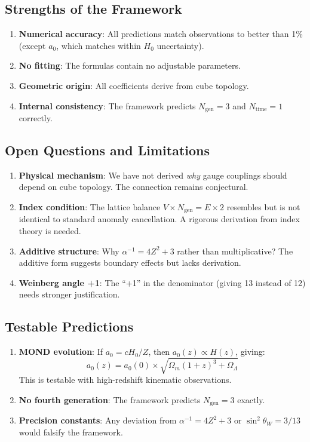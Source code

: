 \documentclass[twocolumn,showpacs,preprintnumbers,amsmath,amssymb,prd]{revtex4-2}
\begin{document}
\subsection{Strengths of the Framework}

\begin{enumerate}
\item \textbf{Numerical accuracy}: All predictions match observations to better than 1\% (except $a_0$, which matches within $H_0$ uncertainty).
\item \textbf{No fitting}: The formulas contain no adjustable parameters.
\item \textbf{Geometric origin}: All coefficients derive from cube topology.
\item \textbf{Internal consistency}: The framework predicts $N_{\text{gen}} = 3$ and $N_{\text{time}} = 1$ correctly.
\end{enumerate}

\subsection{Open Questions and Limitations}

\begin{enumerate}
\item \textbf{Physical mechanism}: We have not derived \emph{why} gauge couplings should depend on cube topology. The connection remains conjectural.
\item \textbf{Index condition}: The lattice balance $V \times N_{\text{gen}} = E \times 2$ resembles but is not identical to standard anomaly cancellation. A rigorous derivation from index theory is needed.
\item \textbf{Additive structure}: Why $\alpha^{-1} = 4Z^2 + 3$ rather than multiplicative? The additive form suggests boundary effects but lacks derivation.
\item \textbf{Weinberg angle +1}: The ``+1'' in the denominator (giving 13 instead of 12) needs stronger justification.
\end{enumerate}

\subsection{Testable Predictions}

\begin{enumerate}
\item \textbf{MOND evolution}: If $a_0 = cH_0/Z$, then $a_0(z) \propto H(z)$, giving:
\begin{equation}
a_0(z) = a_0(0) \times \sqrt{\Omega_m(1+z)^3 + \Omega_\Lambda}
\end{equation}
This is testable with high-redshift kinematic observations.
\item \textbf{No fourth generation}: The framework predicts $N_{\text{gen}} = 3$ exactly.
\item \textbf{Precision constants}: Any deviation from $\alpha^{-1} = 4Z^2 + 3$ or $\sin^2\theta_W = 3/13$ would falsify the framework.
\end{enumerate}
\end{document}
